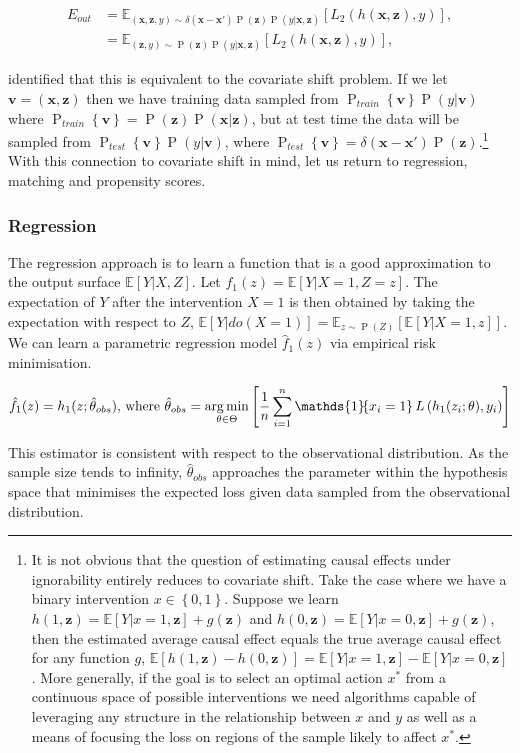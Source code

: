 \documentclass[11pt,a4paper,twoside]{report}
\newcommand{\Pns}[2]{\operatorname{P}_{#1}\left\{#2\right\}}
\newcommand{\vb}[1]{\boldsymbol{#1}}
\newcommand{\Esub}[2]{\mathbb E_{#1}\left[{#2}\right]}
\newcommand{\E}[1]{\mathbb E\left[{#1}\right]}
\newcommand{\set}[1]{\left\{#1\right\}}
\newcommand{\ind}[1]{\mathds{1}\!\!\set{#1}}
\newcommand{\argmin}{\operatornamewithlimits{arg\,min}}
\newcommand{\eqn}[1]{\begin{align}#1\end{align}}
\renewcommand{\P}[1]{\operatorname{P}\left(#1\right)}
\theoremstyle{plain}
\theoremstyle{definition}
\begin{document}
\eqn{
\label{eqn:causal_covariate_shift}
E_{out} &= \Esub{(\vb{x},\vb{z},y)\sim \delta(\vb{x}-\vb{x'})\P{\vb{z}}\P{y|\vb{x},\vb{z}}}{L_2(h(\vb{x},\vb{z}),y)},\\
&= \Esub{(\vb{z},y)\sim \P{\vb{z}}\P{y|\vb{x},\vb{z}}}{L_2(h(\vb{x},\vb{z}),y)},
}

\citet{Johansson2016_counterfactual_rep} identified that this is equivalent to the covariate shift problem. If we let $\vb{v} = (\vb{x},\vb{z})$ then we have training data sampled from $\Pns{train}{\vb{v}}\P{y|\vb{v}}$ where $\Pns{train}{\vb{v}}=\P{\vb{z}}\P{\vb{x}|\vb{z}}$, but at test time the data will be sampled from $\Pns{test}{\vb{v}}\P{y|\vb{v}}$, where $\Pns{test}{\vb{v}} = \delta(\vb{x}-\vb{x'})\P{\vb{z}}$.\footnote{It is not obvious that the question of estimating causal effects under ignorability entirely reduces to  covariate shift. Take the case where we have a binary intervention $x \in \set{0,1}$. Suppose we learn $h(1,\vb{z}) = \E{Y|x=1,\vb{z}}+g(\vb{z})$ and $h(0,\vb{z}) = \E{Y|x=0,\vb{z}}+g(\vb{z})$, then the estimated average causal effect equals the true average causal effect for any function $g$, $\E{h(1,\vb{z})-h(0,\vb{z})} = \E{Y|x=1,\vb{z}} - \E{Y|x=0,\vb{z}}$. More generally, if the goal is to select an optimal action $x^*$ from a continuous space of possible interventions we need algorithms capable of leveraging any structure in the relationship between $x$ and $y$ as well as a means of focusing the loss on regions of the sample likely to affect $x^*$.} With this connection to covariate shift in mind, let us return to regression, matching and propensity scores. 

\subsubsection{Regression}

The regression approach is to learn a function that is a good approximation to the output surface $\E{Y|X,Z}$. Let $f_1(z)= \E{Y|X=1,Z=z}$. The expectation of $Y$ after the intervention $X=1$ is then obtained by taking the expectation with respect to $Z$, $\E{Y|do(X=1)} = \Esub{z \sim \P{Z}}{\E{Y|X=1,z}}$. We can learn a parametric regression model $\hat{f}_1(z)$ via empirical risk minimisation. 

\eqn{
\hat{f}_1(z) = h_1(z;\hat{\theta}_{obs}) \text{, where } \hat{\theta}_{obs} = \argmin_{\theta \in \Theta}\left[\frac{1}{n}\sum_{i=1}^n \ind{x_i=1} L\left(h_1(z_i;\theta),y_i\right)  \right]
}

This estimator is consistent with respect to the observational distribution. As the sample size tends to infinity, $\hat{\theta}_{obs}$ approaches the parameter within the hypothesis space that minimises the expected loss given data sampled from the observational distribution. 
\end{document}
